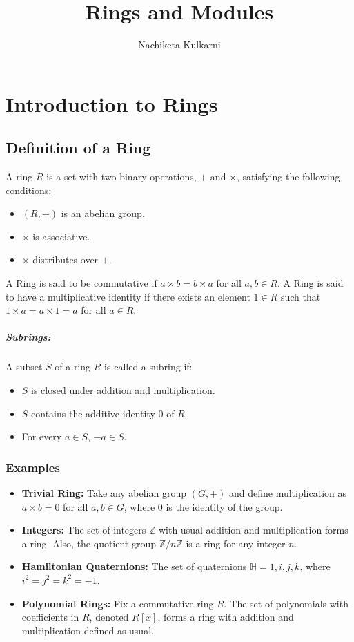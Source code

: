 \documentclass[12pt, oneside]{book}
\date{}
\title{Rings and Modules}
\author{Nachiketa Kulkarni}
\begin{document}
\maketitle
\tableofcontents

\mainmatter
\chapter{Introduction to Rings}
\section{Definition of a Ring}
A ring \(R\) is a set with two binary operations, \(+\) and \(\times\), satisfying the following conditions:
\begin{itemize}
    \item \(\left(R,+\right)\) is an abelian group.
    \item \(\times\) is associative.
    \item \(\times\) distributes over \(+\).
\end{itemize}
A Ring is said to be commutative if \(a \times b = b \times a\) for all \(a, b \in R\).
A Ring is said to have a multiplicative identity if there exists an element \(1 \in R\) such that \(1 \times a = a \times 1 = a\) for all \(a \in R\).

\paragraph{Subrings:} A subset \(S\) of a ring \(R\) is called a subring if:
\begin{itemize}
    \item \(S\) is closed under addition and multiplication.
    \item \(S\) contains the additive identity \(0\) of \(R\).
    \item For every \(a \in S\), \(-a \in S\).
\end{itemize}
\subsection{Examples}
\begin{itemize}
    \item \textbf{Trivial Ring:} Take any abelian group \((G,+)\) and define multiplication as \(a \times b = 0\) for all \(a, b \in G\), where \(0\) is the identity of the group.
    \item \textbf{Integers:} The set of integers \(\mathbb{Z}\) with usual addition and multiplication forms a ring.
    Also, the quotient group \(\mathbb{Z}/n\mathbb{Z}\) is a ring for any integer \(n\).
    \item \textbf{Hamiltonian Quaternions:} The set of quaternions \(\mathbb{H} = {1, i, j, k}\), where \(i^2 = j^2 = k^2 = -1\).
    \item \textbf{Polynomial Rings:} Fix a commutative ring \(R\).
    The set of polynomials with coefficients in \(R\), denoted \(R[x]\), forms a ring with addition and multiplication defined as usual.
\end{itemize}
\end{document}
